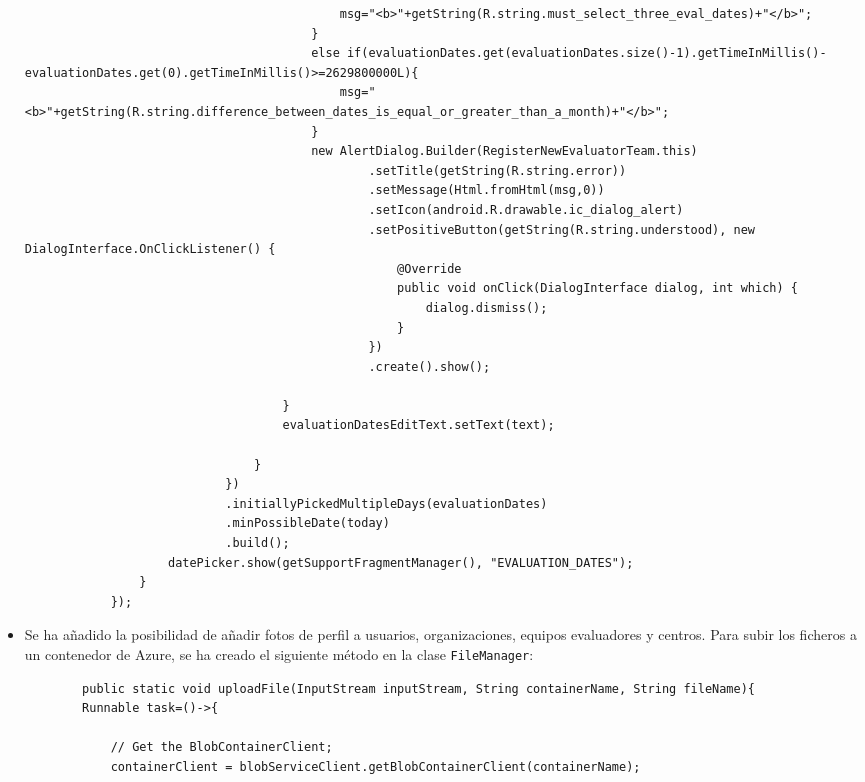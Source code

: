 \begin{itemize}
\begin{lstlisting}
                                            msg="<b>"+getString(R.string.must_select_three_eval_dates)+"</b>";
                                        }
                                        else if(evaluationDates.get(evaluationDates.size()-1).getTimeInMillis()-evaluationDates.get(0).getTimeInMillis()>=2629800000L){
                                            msg="<b>"+getString(R.string.difference_between_dates_is_equal_or_greater_than_a_month)+"</b>";
                                        }
                                        new AlertDialog.Builder(RegisterNewEvaluatorTeam.this)
                                                .setTitle(getString(R.string.error))
                                                .setMessage(Html.fromHtml(msg,0))
                                                .setIcon(android.R.drawable.ic_dialog_alert)
                                                .setPositiveButton(getString(R.string.understood), new DialogInterface.OnClickListener() {
                                                    @Override
                                                    public void onClick(DialogInterface dialog, int which) {
                                                        dialog.dismiss();
                                                    }
                                                })
                                                .create().show();

                                    }
                                    evaluationDatesEditText.setText(text);

                                }
                            })
                            .initiallyPickedMultipleDays(evaluationDates)
                            .minPossibleDate(today)
                            .build();
                    datePicker.show(getSupportFragmentManager(), "EVALUATION_DATES");
                }
            });
    \end{lstlisting}
    \item Se ha añadido la posibilidad de añadir fotos de perfil a usuarios,
    organizaciones, equipos evaluadores y centros. Para subir los ficheros a
    un contenedor de Azure, se ha creado el siguiente método en la clase
    \texttt{FileManager}:
    \begin{lstlisting}
        public static void uploadFile(InputStream inputStream, String containerName, String fileName){
        Runnable task=()->{

            // Get the BlobContainerClient;
            containerClient = blobServiceClient.getBlobContainerClient(containerName);



\end{lstlisting}
\end{itemize}
